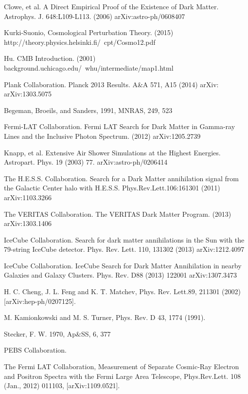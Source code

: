 \documentclass[a4paper,12pt]{article}
\begin{document}
{\begin{thebibliography}{1}
 Clowe, et al.  A Direct Empirical Proof of the Existence of Dark Matter.  Astrophys. J. 648:L109-L113. (2006)  	arXiv:astro-ph/0608407

 Kurki-Suonio, Cosmological Perturbation Theory. (2015) http://theory.physics.helsinki.fi/~cpt/Cosmo12.pdf

 Hu. CMB Introduction.  (2001) background.uchicago.edu/~whu/intermediate/map1.html

 Plank Collaboration.  Planck 2013 Results.   	A\&A 571, A15 (2014)	arXiv: 	arXiv:1303.5075

 Begeman, Broeils, and Sanders, 1991, MNRAS, 249, 523

 Fermi-LAT Collaboration.  Fermi LAT Search for Dark Matter in Gamma-ray Lines and the Inclusive Photon Spectrum. (2012) arXiv:1205.2739

 Knapp, et al.  Extensive Air Shower Simulations at the Highest Energies.  Astropart. Phys. 19 (2003) 77. arXiv:astro-ph/0206414

 The H.E.S.S. Collaboration.  Search for a Dark Matter annihilation signal from the Galactic Center halo with H.E.S.S. Phys.Rev.Lett.106:161301 (2011)  	arXiv:1103.3266

 The VERITAS Collaboration. The VERITAS Dark Matter Program. (2013) arXiv:1303.1406 

 IceCube Collaboration. Search for dark matter annihilations in the Sun with the 79-string IceCube detector. Phys. Rev. Lett. 110, 131302 (2013) arXiv:1212.4097 

 IceCube Collaboration. IceCube Search for Dark Matter Annihilation in nearby Galaxies and Galaxy Clusters. Phys. Rev. D88 (2013) 122001 arXiv:1307.3473

  H. C. Cheng, J. L. Feng and K. T. Matchev, Phys. Rev. Lett.89, 211301 (2002) [arXiv:hep-ph/0207125].

 M. Kamionkowski and M. S. Turner, Phys. Rev. D
43, 1774 (1991).

 Stecker, F. W. 1970, Ap\&SS, 6, 377

 PEBS Collaboration.   %

 The Fermi LAT Collaboration, Measurement of Separate Cosmic-Ray Electron and Positron Spectra with the Fermi Large Area Telescope, Phys.Rev.Lett. 108 (Jan., 2012) 011103, [arXiv:1109.0521].


\end{thebibliography}}
\end{document}
